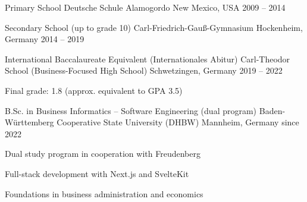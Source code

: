 \documentclass[11pt, a4paper]{awesome-cv}
\begin{document}
\makecvheader


\begin{cventries}

\cventry
  {Primary School}
  {Deutsche Schule Alamogordo}
  {New Mexico, USA}
  {2009 -- 2014}
  {}

\cventry
  {Secondary School (up to grade 10)}
  {Carl-Friedrich-Gauß-Gymnasium}
  {Hockenheim, Germany}
  {2014 -- 2019}
  {}

\cventry
  {International Baccalaureate Equivalent (Internationales Abitur)}
  {Carl-Theodor School (Business-Focused High School)}
  {Schwetzingen, Germany}
  {2019 -- 2022}
  {
    \begin{cvitems}
      \item {Final grade: 1.8 (approx. equivalent to GPA 3.5)}
    \end{cvitems}
  }

\cventry
  {B.Sc. in Business Informatics – Software Engineering (dual program)}
  {Baden-Württemberg Cooperative State University (DHBW)}
  {Mannheim, Germany}
  {since 2022}
  {
    \begin{cvitems}
      \item {Dual study program in cooperation with Freudenberg}
      \item {Full-stack development with Next.js and SvelteKit}
      \item {Foundations in business administration and economics}
    \end{cvitems}
  }

\end{cventries}

\end{document}
